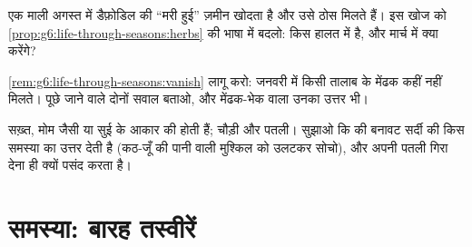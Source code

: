 \begin{exercise}[$\star\star$]\label{exo:g6:life-through-seasons:10}
एक माली अगस्त में डैफ़ोडिल की ``मरी हुई'' ज़मीन खोदता है और उसे ठोस
 मिलते हैं। इस खोज को
\cref{prop:g6:life-through-seasons:herbs} की भाषा में बदलो:  किस
हालत में है, और मार्च में  क्या करेंगे?
\end{exercise}

\begin{exercise}[$\star\star$]\label{exo:g6:life-through-seasons:11}
\cref{rem:g6:life-through-seasons:vanish} लागू करो: जनवरी में किसी
तालाब के मेंढक कहीं नहीं मिलते। पूछे जाने वाले दोनों सवाल बताओ, और
मेंढक-भेक वाला उनका उत्तर भी।
\end{exercise}

\begin{exercise}[$\star\star\star$]\label{exo:g6:life-through-seasons:12}
  सख़्त, मोम जैसी या सुई के आकार की होती हैं; 
 चौड़ी और पतली। सुझाओ कि   की बनावट सर्दी की किस
समस्या का उत्तर देती है (कठ-जूँ की पानी वाली मुश्किल को उलटकर सोचो), और
  अपनी पतली  गिरा देना ही क्यों पसंद करता है।
\end{exercise}

\section{समस्या: बारह तस्वीरें}

